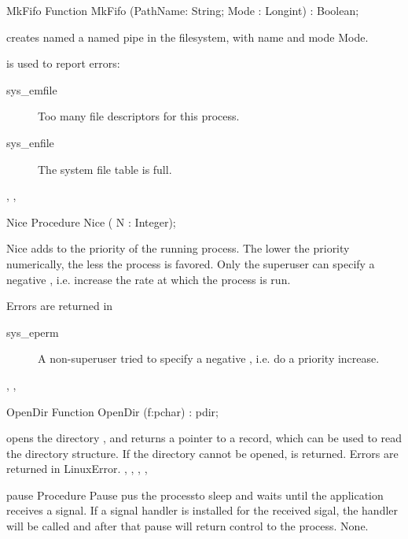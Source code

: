 \begin{function}{MkFifo}
\Declaration
Function MkFifo (PathName: String; Mode : Longint) : Boolean;

\Description
{} creates named a named pipe in the filesystem, with name
 and mode {Mode}. 

\Errors
  is used to report errors:
\begin{description}
\item[sys\_emfile] Too many file descriptors for this process.
\item[sys\_enfile] The system file table is full.
\end{description}

\SeeAlso
{}, , 
\end{function}
\begin{procedure}{Nice}
\Declaration
Procedure Nice ( N : Integer);

\Description
Nice adds  to the priority of the running process. The lower the
priority numerically, the less the process is favored.
Only the superuser can specify a negative , i.e. increase the rate at
which the process is run.

\Errors
 Errors are returned in 
\begin{description}
\item [sys\_eperm] A non-superuser tried to specify a negative , i.e.
do a priority increase.
\end{description}

\SeeAlso
{}, , 
\end{procedure}
\begin{function}{OpenDir}
\Declaration
Function OpenDir (f:pchar) : pdir;

\Description
  opens the directory  , and returns a 
pointer to a  record, which can be used to read the directory 
structure. If the directory cannot be opened,  is returned.
\Errors
Errors are returned in LinuxError.
\SeeAlso
{}, , , ,
\end{function}


\begin{procedure}{pause}
\Declaration
Procedure Pause
\Description
{} pus the processto sleep and waits until the application receives 
a signal. If a signal handler is installed for the received sigal, the
handler will be called and after that pause will return control to the
process.
\Errors
None.
\end{procedure}

